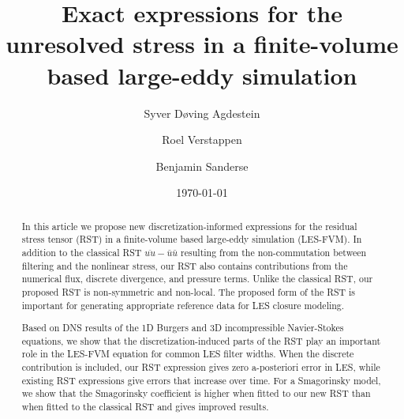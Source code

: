 \documentclass[preprint,twocolumn,5p]{elsarticle}
\title{Exact expressions for the unresolved stress in a finite-volume based large-eddy simulation}
\date{\today}
\begin{document}
\begin{frontmatter}


\author[cwi,eindhoven]{Syver Døving Agdestein}
\author[groningen]{Roel Verstappen}
\author[cwi,eindhoven]{Benjamin Sanderse}



\begin{abstract}
In this article we propose new discretization-informed expressions for the
residual stress tensor (RST) in a finite-volume based large-eddy simulation
(LES-FVM).
In addition to the classical RST $\overline{u u} - \bar{u} \bar{u}$
resulting from the non-commutation between filtering and the nonlinear stress,
our RST also contains contributions from the numerical flux,
discrete divergence, and pressure terms.
Unlike the classical RST, our proposed RST is non-symmetric and non-local.
The proposed form of the RST is important for generating appropriate reference
data for LES closure modeling.

Based on DNS results of the 1D Burgers and 3D incompressible Navier-Stokes
equations, we show that the discretization-induced parts of the RST
play an important role in the LES-FVM equation for common LES filter
widths.
When the discrete contribution is included, our RST expression gives zero
a-posteriori error in LES, while existing RST expressions give errors that
increase over time. For a Smagorinsky model, we show that the Smagorinsky
coefficient is higher when fitted to our new RST than when fitted to the
classical RST and gives improved results.

\end{abstract}



\end{frontmatter}
\end{document}
